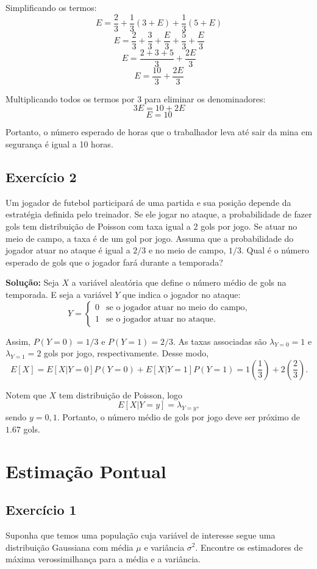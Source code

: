 \documentclass{article}
\begin{document}
Simplificando os termos:
    $$
    E = \frac{2}{3} + \frac{1}{3}(3 + E) + \frac{1}{3}(5 + E)
    $$
    $$
    E = \frac{2}{3} + \frac{3}{3} + \frac{E}{3} + \frac{5}{3} + \frac{E}{3}
    $$
    $$
    E = \frac{2 + 3 + 5}{3} + \frac{2E}{3}
    $$
    $$
    E = \frac{10}{3} + \frac{2E}{3}
    $$

Multiplicando todos os termos por 3 para eliminar os denominadores:
    $$
    3E = 10 + 2E
    $$
    $$
    E = 10
    $$

Portanto, o número esperado de horas que o trabalhador leva até sair da mina em segurança é igual a 10 horas.

\subsection{Exercício 2}
Um jogador de futebol participará de uma partida e sua posição depende da estratégia definida pelo treinador. Se ele jogar no ataque, a probabilidade de fazer gols tem distribuição de Poisson com taxa igual a 2 gols por jogo. Se atuar no meio de campo, a taxa é de um gol por jogo. Assuma que a probabilidade do jogador atuar no ataque é igual a $2/3$ e no meio de campo, $1/3$. Qual é o número esperado de gols que o jogador fará durante a temporada?

\vspace{0.5cm}
\textbf{Solução:} 
Seja $X$ a variável aleatória que define o número médio de gols na temporada. E seja a variável $Y$ que indica o jogador no ataque:
    $$
    Y = 
    \begin{cases}
    0 & \text{se o jogador atuar no meio do campo},\\
    1 & \text{se o jogador atuar no ataque}.
    \end{cases}
    $$

Assim, $P(Y = 0) = 1/3$ e $P(Y = 1) = 2/3$. As taxas associadas são $\lambda_{Y=0} = 1$ e $\lambda_{Y=1} = 2$ gols por jogo, respectivamente. Desse modo,
    $$
    E[X] = E[X|Y = 0]P(Y = 0) + E[X|Y = 1]P(Y = 1) = 1\left(\frac{1}{3}\right) + 2\left(\frac{2}{3}\right).
    $$

Notem que $X$ tem distribuição de Poisson, logo 
    $$
    E[X|Y = y] = \lambda_{Y=y}, 
    $$ 
sendo $y = 0, 1$. Portanto, o número médio de gols por jogo deve ser próximo de $1.67$ gols.

\section{Estimação Pontual}
\subsection{Exercício 1}
Suponha que temos uma população cuja variável de interesse segue uma distribuição Gaussiana com média $\mu$ e variância $\sigma^2$. Encontre os estimadores de máxima verossimilhança para a média e a variância.
\end{document}
